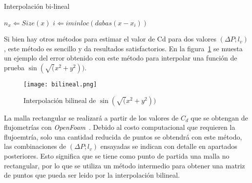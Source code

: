\begin{algorithm}
 \caption{Interpolación bi-lineal}\label{algo:bilineal}
    \SetAlgoLined

    $n_x \Leftarrow Size(x)$\;
    $i \Leftarrow iminloc(dabas(x-x_i))$\;

\end{algorithm}

Si bien hay otros métodos para estimar el valor de Cd para dos valores $(\Delta
P; l_v)$, este método es sencillo y da resultados satisfactorios.
%
En la figura~\ref{fig:bilineal} se muesta un ejemplo del error obtenido
con este método para interpolar una función de prueba 
$\sin(\sqrt(x^2 + y^2))$.

\begin{figure}
    \centering
    \texttt{[image: bilineal.png]}
    \caption{Interpolación bilineal de $\sin(\sqrt(x^2 + y^2))$}\label{fig:bilineal}
\end{figure}

La malla rectangular se realizará a partir de los valores de $C_d$ que se
obtengan de flujometrías con \emph{OpenFoam}~\cite{openfoam}.
%
Debido al costo computacional que requieren la flujoemtría, solo una cantidad
reducida de puntos se obtendrá con este método, las combinaciones de $(\Delta
P; l_v)$ ensayadas se indican con detalle en apartados posteriores.
%
Esto significa que se tiene como punto de partida una malla no rectangular, por
lo que se utiliza un método intermedio para obtener una matriz de puntos que
pueda ser leido por la interpolación bilineal.

